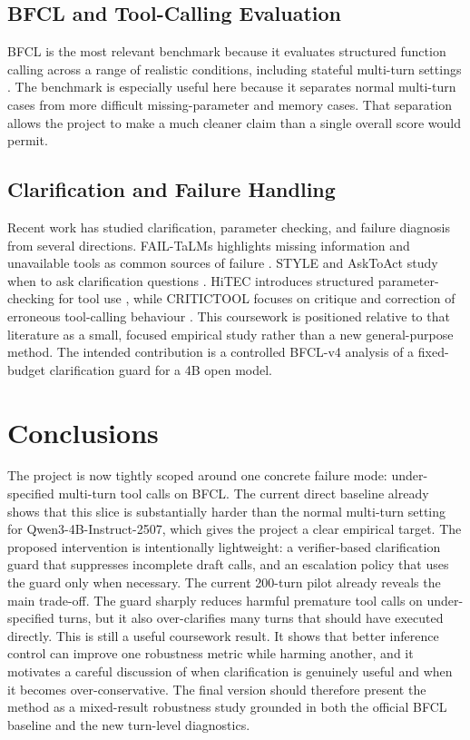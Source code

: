 \documentclass[10pt,twocolumn]{article}
\newcommand{\PrimaryModel}{Qwen3-4B-Instruct-2507}
\begin{document}
\subsection{BFCL and Tool-Calling Evaluation}
BFCL is the most relevant benchmark because it evaluates structured function calling across a range of realistic conditions, including stateful multi-turn settings \citep{patil2025bfcl}. The benchmark is especially useful here because it separates normal multi-turn cases from more difficult missing-parameter and memory cases. That separation allows the project to make a much cleaner claim than a single overall score would permit.

\subsection{Clarification and Failure Handling}
Recent work has studied clarification, parameter checking, and failure diagnosis from several directions. FAIL-TaLMs highlights missing information and unavailable tools as common sources of failure \citep{trevino2025failtalms}. STYLE and AskToAct study when to ask clarification questions \citep{chen2024style,zhang2025asktoact}. HiTEC introduces structured parameter-checking for tool use \citep{cui2025hitec}, while CRITICTOOL focuses on critique and correction of erroneous tool-calling behaviour \citep{huang2025critictool}. This coursework is positioned relative to that literature as a small, focused empirical study rather than a new general-purpose method. The intended contribution is a controlled BFCL-v4 analysis of a fixed-budget clarification guard for a 4B open model.

\section{Conclusions}
The project is now tightly scoped around one concrete failure mode: under-specified multi-turn tool calls on BFCL. The current direct baseline already shows that this slice is substantially harder than the normal multi-turn setting for \PrimaryModel{}, which gives the project a clear empirical target. The proposed intervention is intentionally lightweight: a verifier-based clarification guard that suppresses incomplete draft calls, and an escalation policy that uses the guard only when necessary. The current 200-turn pilot already reveals the main trade-off. The guard sharply reduces harmful premature tool calls on under-specified turns, but it also over-clarifies many turns that should have executed directly. This is still a useful coursework result. It shows that better inference control can improve one robustness metric while harming another, and it motivates a careful discussion of when clarification is genuinely useful and when it becomes over-conservative. The final version should therefore present the method as a mixed-result robustness study grounded in both the official BFCL baseline and the new turn-level diagnostics.



\end{document}
